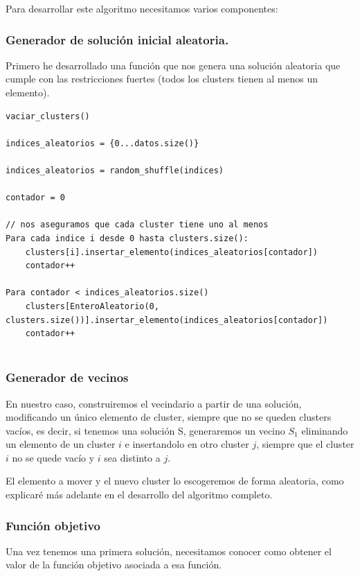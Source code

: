 \documentclass[12pt, spanish]{article}
\begin{document}
Para desarrollar este algoritmo necesitamos varios componentes:
 
 \subsubsection{Generador de solución inicial aleatoria.}
 
 Primero he desarrollado una función que nos genera una solución aleatoria que cumple con las restricciones fuertes (todos los clusters tienen al menos un elemento).
 
 \begin{lstlisting}
vaciar_clusters()

indices_aleatorios = {0...datos.size()}

indices_aleatorios = random_shuffle(indices)

contador = 0

// nos aseguramos que cada cluster tiene uno al menos
Para cada indice i desde 0 hasta clusters.size():
	clusters[i].insertar_elemento(indices_aleatorios[contador])
	contador++
	
Para contador < indices_aleatorios.size()
	clusters[EnteroAleatorio(0, clusters.size())].insertar_elemento(indices_aleatorios[contador])
	contador++
	

\end{lstlisting}
 
 
\subsubsection{Generador de vecinos}

En nuestro caso, construiremos el vecindario a partir de una solución, modificando un único elemento de cluster, siempre que no se queden clusters vacíos, es decir, si tenemos una solución S, generaremos un vecino $S_1$ eliminando un elemento de un cluster $i$ e insertandolo en otro cluster $j$, siempre que el cluster $i$ no se quede vacío y $i$ sea distinto a $j$.

El elemento a mover y el nuevo cluster lo escogeremos de forma aleatoria, como explicaré más adelante en el desarrollo del algoritmo completo.

 
\subsubsection{Función objetivo} 
 
Una vez tenemos una primera solución, necesitamos conocer como obtener el valor de la función objetivo asociada a esa función.
\end{document}

